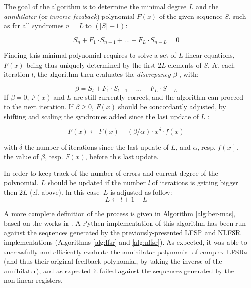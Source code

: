 \documentclass{llncs}
\begin{document}
The goal of the algorithm is to determine the minimal degree $L$ and the \emph{annihilator} (or \emph{inverse feedback}) polynomial $F(x)$ of the given sequence $S$, such as for all syndromes $n = L$ to $(|S|-1)$:

$$S_n + F_1 \cdot S_{n-1} + ... + F_L \cdot S_{n-L} = 0$$

Finding this minimal polynomial requires to solve a set of $L$ linear equations, $F(x)$ being thus uniquely determined by the first $2L$ elements of $S$. At each iteration $l$, the algorithm then evaluates the \emph{discrepancy} $\beta$ \cite{joux,feng:tzeng}, with:

$$ \beta = S_l + F_1 \cdot S_{l-1} + ... + F_L \cdot S_{l-L}$$
If $\beta = 0$, $F(x)$ and $L$ are still currently correct, and the algorithm can proceed to the next iteration. If $\beta \geq 0$, $F(x)$ should be concordantly adjusted, by shifting and scaling the syndromes added since the last update of $L$ \cite{joux}:

$$F(x) \gets F(x) - (\beta/\alpha) \cdot x^\delta \cdot f(x)$$


with $\delta$ the number of iterations since the last update of $L$, and $\alpha$, resp. $f(x)$, the value of $\beta$, resp. $F(x)$, before this last update.

In order to keep track of the number of errors and current degree of the polynomial, $L$ should be updated if the number $l$ of iterations is getting bigger then $2L$ (cf. above). In this case, $L$ is adjusted as follow:
$$L \gets l + 1 - L$$

A more complete definition of the process is given in Algorithm \ref{alg:ber-mas}, based on the works in \cite{joux,rodri}. A Python implementation of this algorithm has been run against the sequences generated by the previously-presented LFSR and NLFSR implementations (Algorithms \ref{alg:lfsr} and \ref{alg:nlfsr}). As expected, it was able to successfully and efficiently evaluate the annihilator polynomial of complex LFSRs (and thus their original feedback polynomial, by taking the inverse of the annihilator); and as expected it failed against the sequences generated by the non-linear registers.
\end{document}
